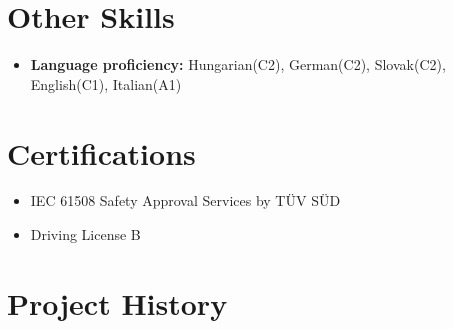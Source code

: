 \documentclass[11pt,a4paper,oneside]{article}
\begin{document}
\section{\bf Other Skills}
\begin{itemize}
\item \textbf{Language proficiency:} Hungarian(C2), German(C2), Slovak(C2), English(C1), Italian(A1)
\end{itemize}

\section{\bf Certifications}
\begin{itemize}
\item IEC 61508 Safety Approval Services by TÜV SÜD
\item Driving License B
\end{itemize}
\clearpage

\section{\bf Project History}
\end{document}
